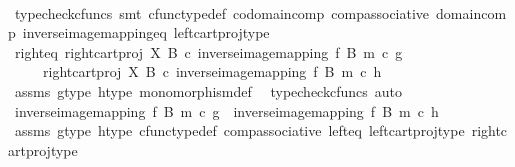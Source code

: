 \begin{isabellebody}
\ \ \ \ \isamarkupfalse%
\ {\isacharparenleft}{\kern0pt}typecheck{\isacharunderscore}{\kern0pt}cfuncs{\isacharcomma}{\kern0pt}\ smt\ cfunc{\isacharunderscore}{\kern0pt}type{\isacharunderscore}{\kern0pt}def\ codomain{\isacharunderscore}{\kern0pt}comp\ comp{\isacharunderscore}{\kern0pt}associative\ domain{\isacharunderscore}{\kern0pt}comp\ inverse{\isacharunderscore}{\kern0pt}image{\isacharunderscore}{\kern0pt}mapping{\isacharunderscore}{\kern0pt}eq\ left{\isacharunderscore}{\kern0pt}cart{\isacharunderscore}{\kern0pt}proj{\isacharunderscore}{\kern0pt}type{\isacharparenright}{\kern0pt}\ \isanewline
\ \ \isamarkupfalse%
\ \isamarkupfalse%
\ right{\isacharunderscore}{\kern0pt}eq{\isacharcolon}{\kern0pt}\ {\isachardoublequoteopen}{\isacharparenleft}{\kern0pt}right{\isacharunderscore}{\kern0pt}cart{\isacharunderscore}{\kern0pt}proj\ X\ B\ {\isasymcirc}\isactrlsub c\ inverse{\isacharunderscore}{\kern0pt}image{\isacharunderscore}{\kern0pt}mapping\ f\ B\ m{\isacharparenright}{\kern0pt}\ {\isasymcirc}\isactrlsub c\ g\isanewline
\ \ \ \ {\isacharequal}{\kern0pt}\ {\isacharparenleft}{\kern0pt}right{\isacharunderscore}{\kern0pt}cart{\isacharunderscore}{\kern0pt}proj\ X\ B\ {\isasymcirc}\isactrlsub c\ inverse{\isacharunderscore}{\kern0pt}image{\isacharunderscore}{\kern0pt}mapping\ f\ B\ m{\isacharparenright}{\kern0pt}\ {\isasymcirc}\isactrlsub c\ h{\isachardoublequoteclose}\isanewline
\ \ \ \ \isamarkupfalse%
\ assms\ g{\isacharunderscore}{\kern0pt}type\ h{\isacharunderscore}{\kern0pt}type\ monomorphism{\isacharunderscore}{\kern0pt}def{}\ \isamarkupfalse%
\ {\isacharparenleft}{\kern0pt}typecheck{\isacharunderscore}{\kern0pt}cfuncs{\isacharcomma}{\kern0pt}\ auto{\isacharparenright}{\kern0pt}\isanewline
\ \ \isamarkupfalse%
\ \isamarkupfalse%
\ {\isachardoublequoteopen}inverse{\isacharunderscore}{\kern0pt}image{\isacharunderscore}{\kern0pt}mapping\ f\ B\ m\ {\isasymcirc}\isactrlsub c\ g\ {\isacharequal}{\kern0pt}\ inverse{\isacharunderscore}{\kern0pt}image{\isacharunderscore}{\kern0pt}mapping\ f\ B\ m\ {\isasymcirc}\isactrlsub c\ h{\isachardoublequoteclose}\isanewline
\ \ \ \ \isamarkupfalse%
\ assms\ g{\isacharunderscore}{\kern0pt}type\ h{\isacharunderscore}{\kern0pt}type\ cfunc{\isacharunderscore}{\kern0pt}type{\isacharunderscore}{\kern0pt}def\ comp{\isacharunderscore}{\kern0pt}associative\ left{\isacharunderscore}{\kern0pt}eq\ left{\isacharunderscore}{\kern0pt}cart{\isacharunderscore}{\kern0pt}proj{\isacharunderscore}{\kern0pt}type\ right{\isacharunderscore}{\kern0pt}cart{\isacharunderscore}{\kern0pt}proj{\isacharunderscore}{\kern0pt}type\isanewline

\end{isabellebody}
